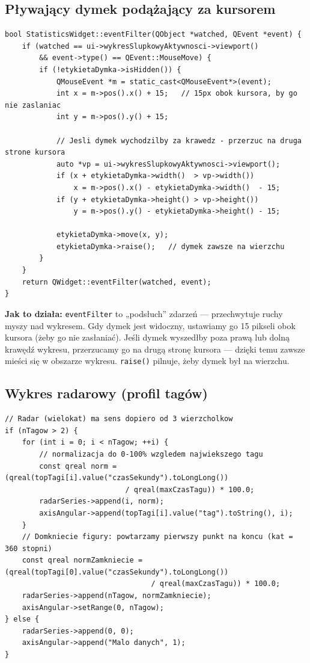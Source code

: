\documentclass[11pt,a4paper]{article}
\begin{document}
\subsection{Pływający dymek podążający za kursorem}

\begin{lstlisting}[caption={Filtr zdarzeń przesuwający etykietę i odbijający ją od krawędzi}]
bool StatisticsWidget::eventFilter(QObject *watched, QEvent *event) {
    if (watched == ui->wykresSlupkowyAktywnosci->viewport()
        && event->type() == QEvent::MouseMove) {
        if (!etykietaDymka->isHidden()) {
            QMouseEvent *m = static_cast<QMouseEvent*>(event);
            int x = m->pos().x() + 15;   // 15px obok kursora, by go nie zaslaniac
            int y = m->pos().y() + 15;

            // Jesli dymek wychodzilby za krawedz - przerzuc na druga strone kursora
            auto *vp = ui->wykresSlupkowyAktywnosci->viewport();
            if (x + etykietaDymka->width()  > vp->width())
                x = m->pos().x() - etykietaDymka->width()  - 15;
            if (y + etykietaDymka->height() > vp->height())
                y = m->pos().y() - etykietaDymka->height() - 15;

            etykietaDymka->move(x, y);
            etykietaDymka->raise();   // dymek zawsze na wierzchu
        }
    }
    return QWidget::eventFilter(watched, event);
}
\end{lstlisting}

\textbf{Jak to działa:} \texttt{eventFilter} to „podsłuch” zdarzeń --- przechwytuje
ruchy myszy nad wykresem. Gdy dymek jest widoczny, ustawiamy go 15 pikseli obok
kursora (żeby go nie zasłaniać). Jeśli dymek wyszedłby poza prawą lub dolną
krawędź wykresu, przerzucamy go na drugą stronę kursora --- dzięki temu zawsze
mieści się w obszarze wykresu. \texttt{raise()} pilnuje, żeby dymek był na wierzchu.

\subsection{Wykres radarowy (profil tagów)}

\begin{lstlisting}[caption={Wielokąt z najczęstszych tagów}]
// Radar (wielokat) ma sens dopiero od 3 wierzcholkow
if (nTagow > 2) {
    for (int i = 0; i < nTagow; ++i) {
        // normalizacja do 0-100% wzgledem najwiekszego tagu
        const qreal norm = (qreal(topTagi[i].value("czasSekundy").toLongLong())
                            / qreal(maxCzasTagu)) * 100.0;
        radarSeries->append(i, norm);
        axisAngular->append(topTagi[i].value("tag").toString(), i);
    }
    // Domkniecie figury: powtarzamy pierwszy punkt na koncu (kat = 360 stopni)
    const qreal normZamkniecie = (qreal(topTagi[0].value("czasSekundy").toLongLong())
                                  / qreal(maxCzasTagu)) * 100.0;
    radarSeries->append(nTagow, normZamkniecie);
    axisAngular->setRange(0, nTagow);
} else {
    radarSeries->append(0, 0);
    axisAngular->append("Malo danych", 1);
}
\end{lstlisting}
\end{document}
